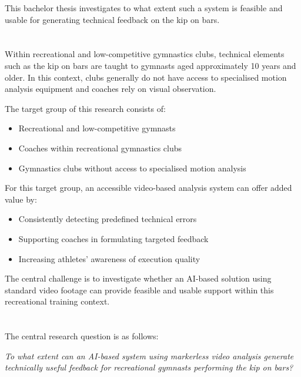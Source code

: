 This bachelor thesis investigates to what extent such a system is feasible and usable for generating technical feedback on the kip on bars.

\section{}%
\label{sec:probleemstelling}

Within recreational and low-competitive gymnastics clubs, technical elements such as the kip on bars are taught to gymnasts aged approximately 10 years and older. In this context, clubs generally do not have access to specialised motion analysis equipment and coaches rely on visual observation.

The target group of this research consists of:

\begin{itemize}
    \item Recreational and low-competitive gymnasts
    \item Coaches within recreational gymnastics clubs
    \item Gymnastics clubs without access to specialised motion analysis
\end{itemize}

For this target group, an accessible video-based analysis system can offer added value by:

\begin{itemize}
    \item Consistently detecting predefined technical errors
    \item Supporting coaches in formulating targeted feedback
    \item Increasing athletes' awareness of execution quality
\end{itemize}

The central challenge is to investigate whether an AI-based solution using standard video footage can provide feasible and usable support within this recreational training context.

\section{}%
\label{sec:onderzoeksvraag}

The central research question is as follows:

\textit{To what extent can an AI-based system using markerless video analysis generate technically useful feedback for recreational gymnasts performing the kip on bars?}


